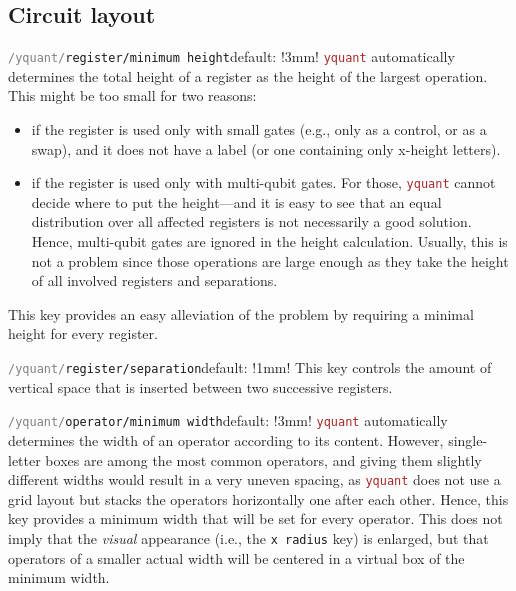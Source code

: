 \documentclass{scrartcl}
\makeatletter
\def\unskipOpt{\vskip-5mm }
\let\unpatched@minted@inline@iii=\minted@inline@iii%
\def\patched@minted@inline@iii#1{%
   \unpatched@minted@inline@iii{#1}%
   \par%
   \endgroup\vskip-\parskip%
   \noindent\ignorespaces%
}
\newenvironment{option}[1]{\vskip5mm%
   \noindent\begin{minipage}[t]{\linewidth}%
      \begingroup%
         \let\minted@inline@iii=\patched@minted@inline@iii%
         \raggedleft%
         \hspace*{-1cm}%
         \phantomsection\label{style:/yquant/#1}%
         \texttt{\textcolor{gray}{/yquant/}\textcolor{mintgreen}{#1}}\hfill default: %
         \tex}{%
   \end{minipage}}
\def\pkg#1{\textcolor{brown}{\texttt{#1}}}
\def\Yquant{\pkg{yquant}}
\makeatother
\begin{document}
      \subsection{Circuit layout}\unskipOpt
         \begin{option}{register/minimum height}!3mm!
            \Yquant{} automatically determines the total height of a register as the height of the largest operation.
            This might be too small for two reasons:
            \begin{itemize}
               \item if the register is used only with small gates (e.g., only as a control, or as a swap), and it does not have a label (or one containing only x\hyp height letters).
               \item if the register is used only with multi\hyp qubit gates.
                  For those, \Yquant{} cannot decide where to put the height---and it is easy to see that an equal distribution over all affected registers is not necessarily a good solution.
                  Hence, multi\hyp qubit gates are ignored in the height calculation.
                  Usually, this is not a problem since those operations are large enough as they take the height of all involved registers and separations.
            \end{itemize}
            This key provides an easy alleviation of the problem by requiring a minimal height for every register.
         \end{option}
         
         \begin{option}{register/separation}!1mm!
            This key controls the amount of vertical space that is inserted between two successive registers.
         \end{option}
         
         \begin{option}{operator/minimum width}!3mm!
            \Yquant{} automatically determines the width of an operator according to its content.
            However, single\hyp letter boxes are among the most common operators, and giving them slightly different widths would result in a very uneven spacing, as \Yquant{} does not use a grid layout but stacks the operators horizontally one after each other.
            Hence, this key provides a minimum width that will be set for every operator.
            This does not imply that the \emph{visual} appearance (i.e., the \texttt{x radius} key) is enlarged, but that operators of a smaller actual width will be centered in a virtual box of the minimum width.
         \end{option}
         
\end{document}
